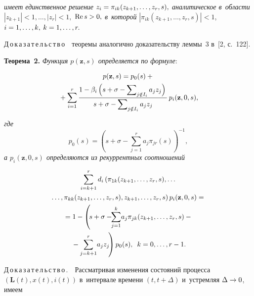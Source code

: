 \begin{multicols}{2}
\vspace*{-3pt}

\noindent
\textit{имеет единственное решение $z_i\hm=\pi_{ik}(z_{k+1},\ldots,z_r,s),$ аналитическое в~об\-ласти}
$|z_{k+1}|<1,\ldots,|z_r|<1,$ $\mathrm{Re}\,s\hm>0,$ \textit{в~которой} $\left|\pi_{ik}(z_{k+1},\ldots,z_r,s)\right|<1$, $i\hm=1,\ldots,k,$
$k\hm=1,\ldots,r.$


\smallskip

\noindent
Д\,о\,к\,а\,з\,а\,т\,е\,л\,ь\,с\,т\,в\,о\ \ теоремы аналогично доказательству леммы~3 в~[2, с.~122].


\smallskip

\noindent
\textbf{Теорема~2.} \textit{Функция $p(\mathbf{z},s)$ определяется по формуле}:

\vspace*{-3pt}

\noindent
\begin{multline}
\label{t1}
p(\mathbf{z},s)=p_0(s)+{}\\
{}+\sum\limits_{i=1}^r \displaystyle\frac{\displaystyle 1-\beta_i\left(s+\sigma-\sum\nolimits_{j\notin I_i}a_jz_j\right)\mathstrut}{\displaystyle s+\sigma-\sum\nolimits_{j\notin I_i}a_jz_j\mathstrut}\,
p_i(\mathbf{z},0,s),
\end{multline}

\vspace*{-3pt}

\noindent
\textit{где}
\begin{equation}
\label{t2}
p_0(s)=\left(s+\sigma-\sum\limits_{j=1}^ra_j\pi_{jr}(s)\right)^{-1},
\end{equation}
\textit{а $p_i(\mathbf{z},0,s)$ определяются из рекуррентных соотношений}

\vspace*{-3pt}

\noindent
\begin{multline}
\label{t3}
\sum\limits_{i=k+1}^rd_i\left(\pi_{1k}(z_{k+1},\ldots,z_r,s),\ldots\right.\\
\left.\ldots ,\pi_{kk}(z_{k+1},\ldots,z_r,s),
z_{k+1},\ldots,z_r,s\right)p_i(\mathbf{z},0,s)={}\\
{}=1-\left(\!s+\sigma-\!\!\sum\limits_{j=1}^k \!a_j \pi_{jk}(z_{k+1},\ldots,z_r,s)-{}\right.\\
\left.{}-
\sum\limits_{j=k+1}^r \! a_j z_j\!\right)p_0(s),\enskip 
k=0,\ldots,r-1.
\end{multline}

\noindent
Д\,о\,к\,а\,з\,а\,т\,е\,л\,ь\,с\,т\,в\,о\,.\ \ 
Рассматривая изменения состояний процесса $(\mathbf{L}(t),x(t),i(t))$ в~интервале времени $(t,t+\Delta)$ 
и~устремляя $\Delta\hm\rightarrow 0$, имеем


\end{multicols}
